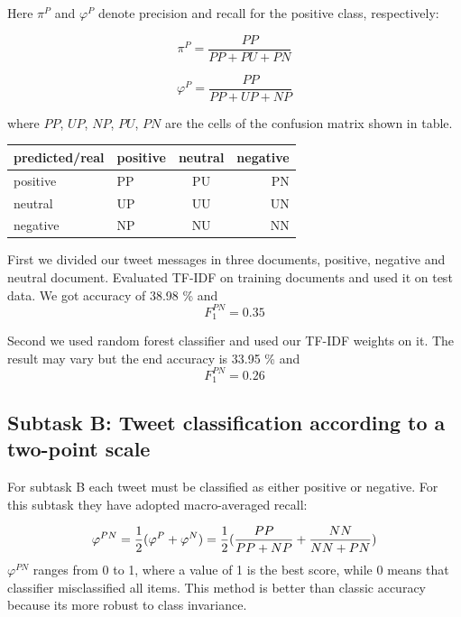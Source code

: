 \documentclass[runningheads,a4paper]{llncs}
\begin{document}
Here $\pi^P$ and $\varphi^P$ denote precision and recall for the positive class, respectively: 

\begin{equation}
\pi^P = \frac{PP}{PP + PU + PN}
\end{equation}

\begin{equation}
\varphi^P = \frac{PP}{PP + UP + NP}
\end{equation}

where $PP$, $UP$, $NP$, $PU$, $PN$ are the cells of the confusion matrix shown in table. 

\begin{center}
  \begin{tabular}{ | l | l | c | r |}
    \hline
  predicted/real   & positive & neutral & negative \\ \hline
   positive  & PP & PU & PN \\ \hline
   neutral  & UP & UU & UN \\ \hline
   negative  & NP & NU & NN \\
    \hline
  \end{tabular}
\end{center}

First we divided our tweet messages in three documents, positive, negative and neutral document. Evaluated TF-IDF on training documents and used it on test data. We got accuracy of 38.98 \% and
\begin{equation}
F^{PN}_1 = 0.35
\end{equation}

Second we used random forest classifier and used our TF-IDF weights on it. The result may vary but the end accuracy is 33.95 \% and
\begin{equation}
F^{PN}_1 = 0.26
\end{equation}

\subsection{Subtask B: Tweet classification according to a two-point scale}
For subtask B each tweet must be classified as either positive or negative. For this subtask they have adopted macro-averaged recall: 

\begin{equation}
\varphi^{PN} = \frac{1}{2}(\varphi^P + \varphi^N) \\
= \frac{1}{2}(\frac{PP}{PP + NP} + \frac{NN}{NN + PN})
\end{equation}
$\varphi^{PN}$ ranges from 0 to 1, where a value of 1 is the best score, while 0 means that classifier misclassified all items. This method is better than classic accuracy because its more robust to class invariance. 
\end{document}
